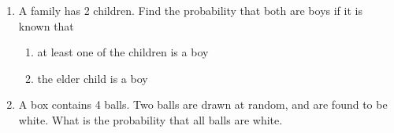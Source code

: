 \begin{enumerate}

\item A family has 2 children. Find the probability that both are boys if it is known that
    \begin{enumerate}
        \item at least one of the children is a boy
        \item the elder child is a boy
    \end{enumerate}

\item A box contains 4 balls. Two balls are drawn at random, and are found to be white. What is the probability that all balls are white.

\end{enumerate}